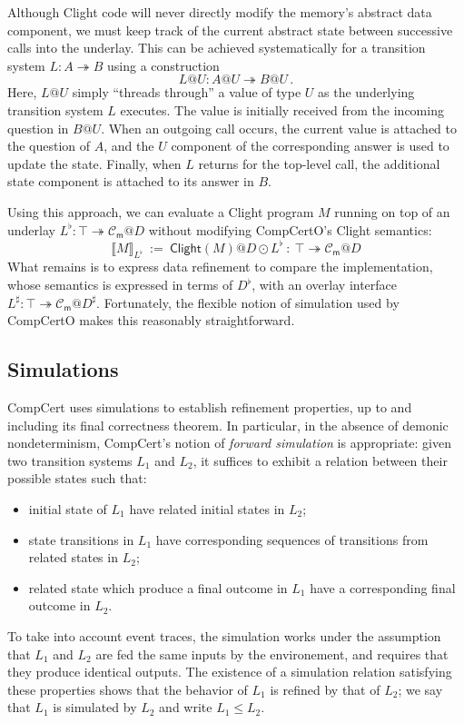 \documentclass[acmsmall,screen,review,anonymous]{acmart}
\newcommand{\kw}[1]{\ensuremath{ \mathsf{#1} }}
\begin{document}
Although Clight code will never directly modify
the memory's abstract data component,
we must keep track of the current abstract state
between successive calls into the underlay.
This can be achieved systematically
for a transition system
$L : A \twoheadrightarrow B$
using a construction
\[
  L@U : A@U \twoheadrightarrow B@U
  \,.
\]
Here, $L@U$ simply ``threads through'' a value of type $U$
as the underlying transition system $L$ executes.
The value is initially received from the incoming question in $B@U$.
When an outgoing call occurs,
the current value is attached to the question of $A$,
and the $U$ component of the corresponding answer
is used to update the state.
Finally, when $L$ returns for the top-level call,
the additional state component is attached to its answer in $B$.

Using this approach,
we can evaluate a Clight program $M$ running on top of an underlay
$L^\flat : \top \twoheadrightarrow \mathcal{C}_\kw{m}@D$
without modifying CompCertO's Clight semantics:
\[
  \llbracket M \rrbracket_{L^\flat} \: := \:
    \kw{Clight}(M)@D \odot L^\flat \: : \:
    \top \twoheadrightarrow \mathcal{C}_\kw{m}@D
\]
What remains is to express data refinement
to compare the implementation,
whose semantics is expressed in terms of $D^\flat$,
with an overlay interface
$L^\sharp : \top \twoheadrightarrow \mathcal{C}_\kw{m}@D^\sharp$.
Fortunately,
the flexible notion of simulation used by CompCertO
makes this reasonably straightforward.


\subsection{Simulations} %


CompCert uses simulations
to establish refinement properties,
up to and including its final correctness theorem.
In particular,
in the absence of demonic nondeterminism,
CompCert's notion of \emph{forward simulation} is appropriate:
given two transition systems $L_1$ and $L_2$,
it suffices to exhibit a relation between their possible states
such that:
\begin{itemize}
  \item initial state of $L_1$ have related initial states in $L_2$;
  \item state transitions in $L_1$ have corresponding sequences of transitions
    from related states in $L_2$;
  \item related state which produce a final outcome in $L_1$
    have a corresponding final outcome in $L_2$.
\end{itemize}
To take into account event traces,
the simulation works under the assumption that
$L_1$ and $L_2$ are fed the same inputs by the environement,
and requires that they produce identical outputs.
The existence of a simulation relation satisfying these properties
shows that the behavior of $L_1$ is refined by that of $L_2$;
we say that $L_1$ is simulated by $L_2$ and write $L_1 \le L_2$.
\end{document}
